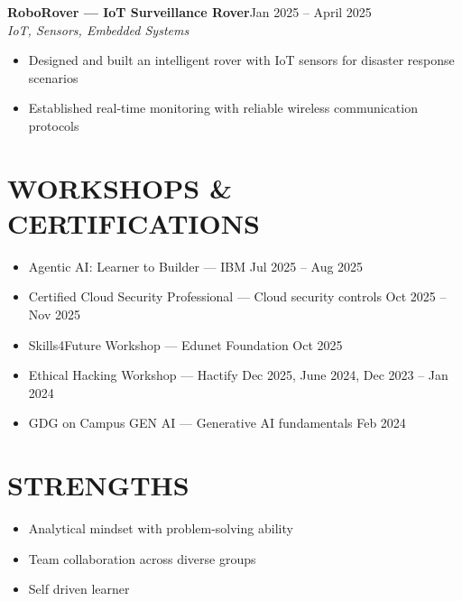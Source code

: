 \documentclass[letterpaper,11pt]{article}
\newcommand{\projectentry}[3]{%
  \noindent\textbf{#1}\hfill#2\\
  \textit{#3}\vspace{2pt}
}
\newcommand{\workshopentry}[2]{%
  \item #1 \hfill #2
}
\begin{document}
\vspace{4pt}

\projectentry{RoboRover --- IoT Surveillance Rover}%
  {Jan 2025 -- April 2025}%
  {IoT, Sensors, Embedded Systems}

\begin{itemize}[leftmargin=0.25in, itemsep=2pt, parsep=0pt, topsep=0pt]
  \item Designed and built an intelligent rover with IoT sensors for disaster response scenarios
  \item Established real-time monitoring with reliable wireless communication protocols
\end{itemize}

\section{WORKSHOPS \& CERTIFICATIONS}

\begin{itemize}[leftmargin=0.25in, itemsep=2pt, parsep=0pt, topsep=0pt]
  \workshopentry{Agentic AI: Learner to Builder --- IBM}{Jul 2025 -- Aug 2025}
  \workshopentry{Certified Cloud Security Professional --- Cloud security controls}{Oct 2025 -- Nov 2025}
  \workshopentry{Skills4Future Workshop --- Edunet Foundation}{Oct 2025}
  \workshopentry{Ethical Hacking Workshop --- Hactify}{Dec 2025, June 2024, Dec 2023 -- Jan 2024}
  \workshopentry{GDG on Campus GEN AI --- Generative AI fundamentals}{Feb 2024}
\end{itemize}

\section{STRENGTHS}

\begin{itemize}[leftmargin=0.25in, itemsep=2pt, parsep=0pt, topsep=0pt]
  \item Analytical mindset with problem-solving ability
  \item Team collaboration across diverse groups
  \item Self driven learner
\end{itemize}
\end{document}
